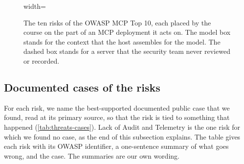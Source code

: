 \begin{figure}[tb]
\begin{adjustbox}{width=\textwidth}
  \end{adjustbox}
  \caption{The ten risks of the OWASP MCP Top 10, each placed by the course on the part of an MCP
  deployment it acts on. The model box stands for the context that the host assembles for the
  model. The dashed box stands for a server that the security team never reviewed or recorded.}
  \label{fig:threats-owasp}
\end{figure}

\subsection{Documented cases of the risks}
\label{sec:threats-cases}

For each risk, we name the best-supported documented public case that we found, read at its primary
source, so that the risk is tied to something that happened (\cref{tab:threats-cases}). Lack of
Audit and Telemetry is the one risk for which we found no case, as the end of this subsection
explains. The table gives each risk with its OWASP identifier, a one-sentence summary of what goes
wrong, and the case. The summaries are our own wording.


